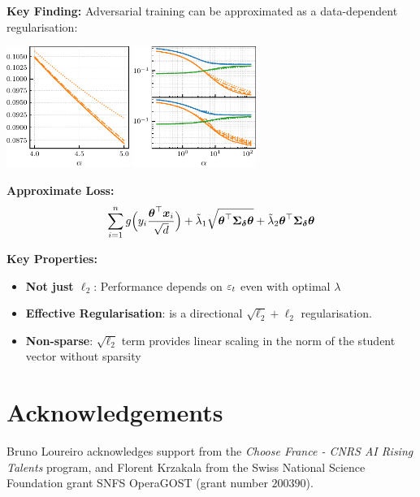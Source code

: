 \documentclass[a0paper,fleqn]{betterportraitposter}
\theoremstyle{plain}
\theoremstyle{definition}
\theoremstyle{remark}
\begin{document}
{\begin{multicols}{3}
\textbf{Key Finding:} Adversarial training can be approximated as a data-dependent regularisation:

\begin{center}
\includegraphics[width=0.3\textwidth]{Assets/gen_lambda_optimal_sweep_alpha.pdf}
\includegraphics[width=0.3\textwidth]{Assets/effective_regularisation.pdf}
\end{center}

\textbf{Approximate Loss:}
\begin{equation}
    \sum_{i = 1}^{n} 
    g \Big( y_{i} \frac{\boldsymbol{\theta}^\top \boldsymbol{x}_{i}}{\sqrt{d}} \Big) 
    + \tilde{\lambda}_1 \sqrt{\boldsymbol{\theta}^\top \boldsymbol{\Sigma}_{\boldsymbol{\delta}} \boldsymbol{\theta}} + \tilde{\lambda}_2 \boldsymbol{\theta}^\top \boldsymbol{\Sigma}_{\boldsymbol{\delta}} \boldsymbol{\theta}
\end{equation}

\textbf{Key Properties:}
\begin{itemize}
    \item \textbf{Not just $\ell_2$}: Performance depends on $\varepsilon_t$ even with optimal $\lambda$
    \item \textbf{Effective Regularisation}: is a directional \(\sqrt{\ell_2} + \ell_2\) regularisation. 
    \item \textbf{Non-sparse}: $\sqrt{\ell_2}$ term provides linear scaling in the norm of the student vector without sparsity
\end{itemize}

\section{Acknowledgements}

Bruno Loureiro acknowledges support from the \textit{Choose France - CNRS AI Rising Talents} program, and Florent Krzakala from the Swiss National Science Foundation grant SNFS OperaGOST  (grant number $200390$).





\columnbreak

\end{multicols}
}
\end{document}
